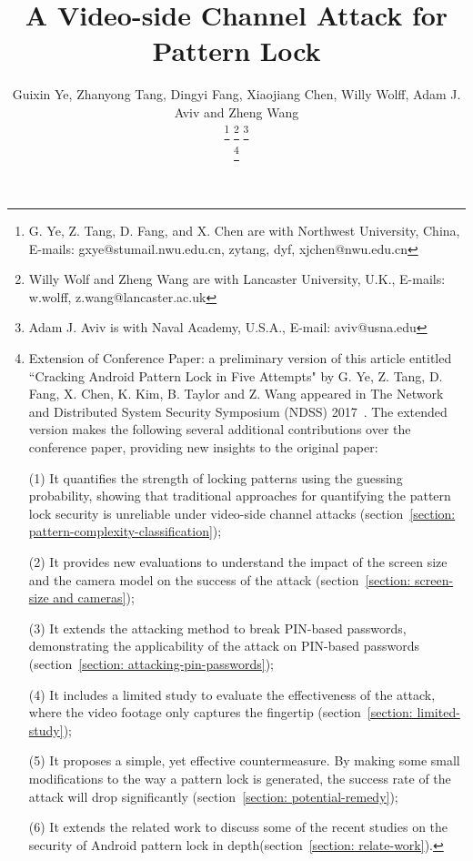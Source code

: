 \documentclass[journal,table,twoside]{IEEEtran}
\begin{document}
\title{A Video-side Channel Attack for Pattern Lock}
\author{Guixin Ye, Zhanyong Tang, Dingyi Fang, Xiaojiang Chen,
        Willy Wolff, Adam J. Aviv and Zheng Wang

    \thanks{G. Ye, Z. Tang, D. Fang, and X. Chen are with Northwest University, China, E-mails: gxye@stumail.nwu.edu.cn, {zytang, dyf, xjchen}@nwu.edu.cn }%
    \thanks{Willy Wolf and Zheng Wang are with Lancaster University, U.K., E-mails: {w.wolff, z.wang}@lancaster.ac.uk}%
    \thanks{Adam J. Aviv is with Naval Academy, U.S.A., E-mail: aviv@usna.edu}

    \thanks{
            Extension of Conference Paper: a preliminary version of this article entitled ``Cracking Android Pattern Lock
            in Five Attempts" by G. Ye, Z. Tang, D. Fang, X. Chen, K. Kim, B. Taylor and Z. Wang appeared in
            The Network and Distributed System Security Symposium (NDSS) 2017~\cite{ye2017cracking}.
            The extended version makes the following several additional contributions over the conference
            paper, providing new insights to the original paper:

            (1)	It quantifies the strength of locking patterns using the guessing probability, showing that traditional approaches for quantifying the pattern lock security is unreliable under video-side channel attacks (section~\ref{section: pattern-complexity-classification});


            (2)	It provides new evaluations to understand the impact of the screen size and the camera model on the success of the attack (section~\ref{section: screen-size and cameras});

            (3)	It extends the attacking method to break PIN-based passwords, demonstrating the applicability of the attack on PIN-based passwords (section~\ref{section: attacking-pin-passwords});

            (4)	It includes a limited study to evaluate the effectiveness of the attack, where the video footage only captures the fingertip (section~\ref{section: limited-study});


            (5)	It proposes a simple, yet effective countermeasure. By making some small modifications to the way a pattern lock is generated, the success rate of the attack will drop significantly (section~\ref{section: potential-remedy});


            (6)	It extends the related work to discuss some of the recent studies on the security of Android pattern lock in depth(section~\ref{section: relate-work}).

    }
}
\end{document}
